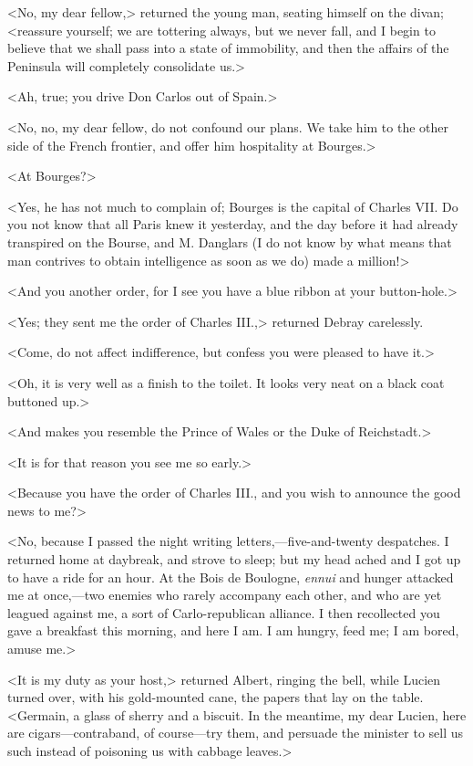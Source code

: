  <No, my dear fellow,> returned the young man, seating himself on the divan; <reassure yourself; we are tottering always, but we never fall, and I begin to believe that we shall pass into a state of immobility, and then the affairs of the Peninsula will completely consolidate us.> 

 <Ah, true; you drive Don Carlos out of Spain.> 

 <No, no, my dear fellow, do not confound our plans. We take him to the other side of the French frontier, and offer him hospitality at Bourges.> 

 <At Bourges?> 

 <Yes, he has not much to complain of; Bourges is the capital of Charles VII. Do you not know that all Paris knew it yesterday, and the day before it had already transpired on the Bourse, and M. Danglars (I do not know by what means that man contrives to obtain intelligence as soon as we do) made a million!> 

 <And you another order, for I see you have a blue ribbon at your button-hole.> 

 <Yes; they sent me the order of Charles III.,> returned Debray carelessly. 

 <Come, do not affect indifference, but confess you were pleased to have it.> 

 <Oh, it is very well as a finish to the toilet. It looks very neat on a black coat buttoned up.> 

 <And makes you resemble the Prince of Wales or the Duke of Reichstadt.> 

 <It is for that reason you see me so early.> 

 <Because you have the order of Charles III., and you wish to announce the good news to me?> 

 <No, because I passed the night writing letters,—five-and-twenty despatches. I returned home at daybreak, and strove to sleep; but my head ached and I got up to have a ride for an hour. At the Bois de Boulogne, \textit{ennui} and hunger attacked me at once,—two enemies who rarely accompany each other, and who are yet leagued against me, a sort of Carlo-republican alliance. I then recollected you gave a breakfast this morning, and here I am. I am hungry, feed me; I am bored, amuse me.> 

 <It is my duty as your host,> returned Albert, ringing the bell, while Lucien turned over, with his gold-mounted cane, the papers that lay on the table. <Germain, a glass of sherry and a biscuit. In the meantime, my dear Lucien, here are cigars—contraband, of course—try them, and persuade the minister to sell us such instead of poisoning us with cabbage leaves.> 


